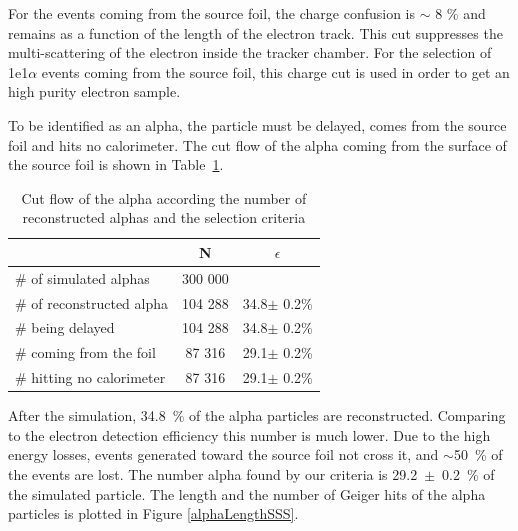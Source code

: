 \documentclass[main.tex]{subfiles}
\begin{document}
\bigskip


\noindent For the events coming from the source foil, the charge confusion is $\sim$ 8 $\%$ and remains as  a function of the length of the electron track. This cut suppresses the multi-scattering of the electron inside the tracker chamber. For the selection of 1e1$\alpha$ events coming from the source foil, this charge cut is used in order to get an high purity electron sample.


\FloatBarrier


\noindent To be identified as an alpha, the particle must be delayed, comes from the source foil and hits no calorimeter. The cut flow of the alpha coming from the surface of the source foil is shown in Table~\ref{Cutflowelectronalpha}.


\begin{table}[h!]
\begin{center}
\begin{tabular}{l|c|c}
 & N & $\epsilon$ \\
\hline
$\#$ of simulated alphas & 300 000 & \\
\hline
$\#$ of reconstructed alpha & 104 288 & 34.8$\pm$ 0.2\%\\
$\#$ being delayed          & 104 288 & 34.8$\pm$ 0.2\%\\
$\#$ coming from the foil   & 87 316  & 29.1$\pm$ 0.2\%\\
$\#$ hitting no calorimeter & 87 316  & 29.1$\pm$ 0.2\%\\
\end{tabular}
\end{center}
\caption{Cut flow of the alpha according the number of reconstructed alphas and the selection criteria}
\label{Cutflowelectronalpha}
\end{table}


\bigskip


\noindent After the simulation, 34.8~\% of the alpha particles are reconstructed. Comparing to the electron detection efficiency this number is much lower. Due to the high energy losses, events generated toward the source foil not cross it, and $\sim$50~\% of the events are lost. The number alpha found by our criteria is 29.2~$\pm$~0.2~\% of the simulated particle. The length and the number of Geiger hits of the alpha particles is plotted in Figure \ref{alphaLengthSSS}.


\bigskip
\end{document}
